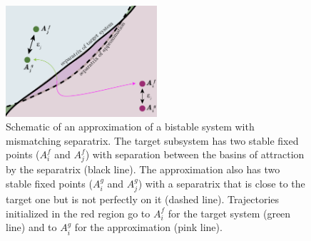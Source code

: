 \documentclass{article}
\newcounter{ct}
\begin{document}
\setlength\belowcaptionskip{-1ex}
\begin{figure}
  \centering
  \includegraphics[width=0.5\textwidth]{separatrices}
  \caption{
	Schematic of an approximation of a bistable system with mismatching separatrix. %
	The target subsystem has two stable fixed points ($A_i^f$ and $A_j^f$) with separation between the basins of attraction by the separatrix (black line).
	The approximation also has two stable fixed points ($A_i^g$ and $A_j^g$) with a separatrix that is close to the target one but is not perfectly on it (dashed line).
	Trajectories initialized in the red region go to $A_i^f$ for the target system (green line) and to $A_i^g$ for the approximation (pink line). %
  }\label{fig:separatrices}
\end{figure}
\end{document}
